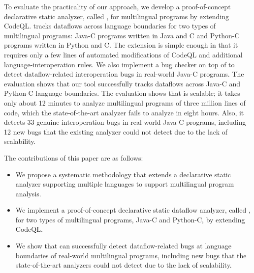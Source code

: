 To evaluate the practicality of our approach, we develop a proof-of-concept
declarative static analyzer, called \ours, for multilingual programs by
extending CodeQL. \ours tracks dataflows across language boundaries for two
types of multilingual programs: Java-C programs written in Java and C and
Python-C programs written in Python and C. The extension is simple enough in
that it requires only a few lines of automated modifications of CodeQL and
additional language-interoperation rules. We also implement a bug checker on
top of \ours to detect dataflow-related interoperation bugs in real-world
Java-C programs.  The evaluation shows that our tool successfully tracks
dataflows across Java-C and Python-C language boundaries.  The evaluation shows
that \ours is scalable; it takes only about 12 minutes to analyze multilingual
programs of three million lines of code, which the state-of-the-art analyzer
fails to analyze in eight hours.  Also, it detects 33 genuine interoperation
bugs in real-world Java-C programs, including 12 new bugs that the existing
analyzer could not detect due to the lack of scalability.

The contributions of this paper are as follows:
\begin{itemize}
\item We propose a systematic methodology that extends a declarative static
analyzer supporting multiple languages to support multilingual program
analysis.

\item We implement a proof-of-concept declarative static dataflow analyzer,
called \ours, for two types of multilingual programs, Java-C and Python-C, by
extending CodeQL.

\item We show that \ours can successfully detect dataflow-related bugs at
language boundaries of real-world multilingual programs, including new bugs
that the state-of-the-art analyzers could not detect due to the lack of
scalability.

\end{itemize}
